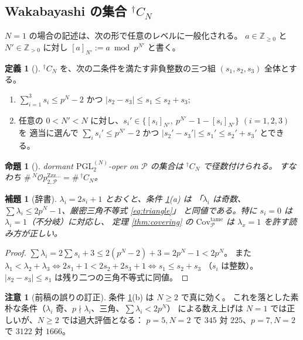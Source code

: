 \documentclass[a4paper,11pt]{ltjsarticle}
\theoremstyle{plain}
\newtheorem{proposition}[theorem]{命題}
\newtheorem{lemma}[theorem]{補題}
\theoremstyle{definition}
\newtheorem{definition}[theorem]{定義}
\newtheorem{remark}[theorem]{注意}
\newcommand{\bbZ}{\mathbb{Z}}
\newcommand{\sP}{\mathscr{P}}
\newcommand{\Op}{\mathcal{O}p}
\newcommand{\Zzz}{\mathrm{Zzz\dots}}
\begin{document}
\subsection{Wakabayashi の集合 ${}^{\dagger}C_N$}\label{ss:Cdagger}

$N=1$ の場合の記述は、次の形で任意のレベルに一般化される。
$a\in\bbZ_{\ge0}$ と $N'\in\bbZ_{>0}$ に対し $[a]_{N'}:=a\bmod p^{N'}$ と書く。

\begin{definition}[{\cite[(10.6)]{Wak2}}]\label{def:Cdagger}
${}^{\dagger}C_N$ を、次の二条件を満たす非負整数の三つ組 $(s_1,s_2,s_3)$ 全体とする。
\begin{enumerate}[label=(\alph*),leftmargin=2em]
\item $\displaystyle\sum_{i=1}^3 s_i\le p^N-2$ かつ $|s_2-s_3|\le s_1\le s_2+s_3$;
\item 任意の $0<N'<N$ に対し、$s_i'\in\{[s_i]_{N'},\ p^{N'}-1-[s_i]_{N'}\}$ $(i=1,2,3)$ を
      適当に選んで $\sum_i s_i'\le p^{N'}-2$ かつ $|s_2'-s_3'|\le s_1'\le s_2'+s_3'$
      とできる。
\end{enumerate}
\end{definition}

\begin{proposition}[{\cite[Prop.~10.1.4, 10.3.3]{Wak2}}]\label{prop:Cdagger}
dormant $\mathrm{PGL}_2^{(N)}$-oper on $\sP$ の集合は ${}^{\dagger}C_N$ で径数付けられる。
すなわち $\#\,{}^N\Op^{\Zzz}_{2,\sP}=\#\,{}^{\dagger}C_N$。
\end{proposition}

\begin{lemma}[辞書]\label{lem:dict}
$\lambda_i=2s_i+1$ とおくと、条件 \ref{def:Cdagger}(a) は
「$\lambda_i$ は奇数、$\sum\lambda_i\le 2p^N-1$、厳密三角不等式 \eqref{eq:triangle}」
と同値である。特に $s_i=0$ は $\lambda_i=1$（不分岐）に対応し、
定理 \ref{thm:covering} の $\mathrm{Cov}^{\mathrm{tame}}_{\sP}$ は
$\lambda_x=1$ を許す読み方が正しい。
\end{lemma}

\begin{proof}
$\sum\lambda_i=2\sum s_i+3\le 2(p^N-2)+3=2p^N-1<2p^N$。
また $\lambda_1<\lambda_2+\lambda_3\iff 2s_1+1<2s_2+2s_3+1\iff s_1\le s_2+s_3$
（$s_i$ は整数）。$|s_2-s_3|\le s_1$ は残り二つの三角不等式に同値。
\end{proof}

\begin{remark}[前稿の誤りの訂正]\label{rem:erratum}
条件 \ref{def:Cdagger}(b) は $N\ge2$ で真に効く。
これを落とした素朴な条件（$\lambda_i$ 奇、$p\nmid\lambda_i$、三角、$\sum\lambda_i<2p^N$）
による数え上げは $N=1$ では正しいが、$N\ge2$ では過大評価となる：
$p=5,N=2$ で $345$ 対 $225$、$p=7,N=2$ で $3122$ 対 $1666$。
\end{remark}
\end{document}
